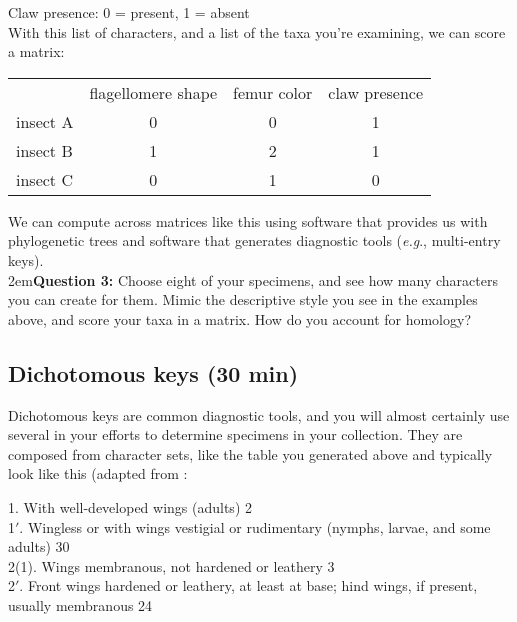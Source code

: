 \documentclass[letterpaper, 11pt]{article}
\begin{document}
Claw presence: 0 = present, 1 = absent\\

With this list of characters, and a list of the taxa you're examining, we can score a matrix:
\begin{table}[H]
\centering
\label{my-label}
\begin{tabular}{lccc}
                             & \multicolumn{1}{l}{flagellomere shape} & \multicolumn{1}{l}{femur color} & \multicolumn{1}{l}{claw presence} \\ \cline{2-4} 
\multicolumn{1}{l|}{insect A} & \multicolumn{1}{c|}{0}                 & \multicolumn{1}{c|}{0}          & \multicolumn{1}{c|}{1}            \\ \cline{2-4} 
\multicolumn{1}{l|}{insect B} & \multicolumn{1}{c|}{1}                 & \multicolumn{1}{c|}{2}          & \multicolumn{1}{c|}{1}            \\ \cline{2-4} 
\multicolumn{1}{l|}{insect C} & \multicolumn{1}{c|}{0}                 & \multicolumn{1}{c|}{1}          & \multicolumn{1}{c|}{0}            \\ \cline{2-4} 
\end{tabular}
\end{table}

\noindent{}We can compute across matrices like this using software that provides us with phylogenetic trees and software that generates diagnostic tools (\textit{e.g}., multi-entry keys).\\

\hangindent2em\textbf{Question 3:} Choose eight of your specimens, and see how many characters you can create for them. Mimic the descriptive style you see in the examples above, and score your taxa in a matrix. How do you account for homology?\\

\subsection{Dichotomous keys (30 min)}
Dichotomous keys are common diagnostic tools, and you will almost certainly use several in your efforts to determine specimens in your collection. They are composed from character sets, like the table you generated above and typically look like this (adapted from \cite[][page 151]{borror1989introduction}:\\

\begin{adjustwidth}{1cm}{}
1. With well-developed wings (adults) \dotfill{} 2\\
1$'$. Wingless or with wings vestigial or rudimentary (nymphs, larvae, and some adults) \dotfill{} 30\\

\noindent{}2(1). Wings membranous, not hardened or leathery \dotfill{} 3\\
2$'$. Front wings hardened or leathery, at least at base; hind wings, if present, usually membranous \dotfill{}24\\
\end{adjustwidth}
\end{document}
